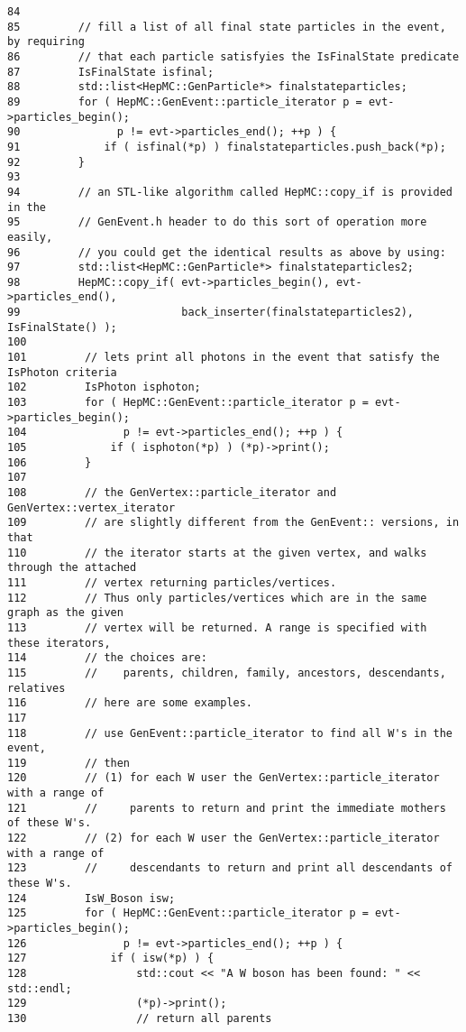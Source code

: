 \begin{DocInclude}
\begin{verbatim}
84 
85         // fill a list of all final state particles in the event, by requiring
86         // that each particle satisfyies the IsFinalState predicate
87         IsFinalState isfinal;
88         std::list<HepMC::GenParticle*> finalstateparticles;
89         for ( HepMC::GenEvent::particle_iterator p = evt->particles_begin();
90               p != evt->particles_end(); ++p ) {
91             if ( isfinal(*p) ) finalstateparticles.push_back(*p);
92         }
93 
94         // an STL-like algorithm called HepMC::copy_if is provided in the
95         // GenEvent.h header to do this sort of operation more easily,
96         // you could get the identical results as above by using:
97         std::list<HepMC::GenParticle*> finalstateparticles2;
98         HepMC::copy_if( evt->particles_begin(), evt->particles_end(), 
99                         back_inserter(finalstateparticles2), IsFinalState() );
100 
101         // lets print all photons in the event that satisfy the IsPhoton criteria
102         IsPhoton isphoton;
103         for ( HepMC::GenEvent::particle_iterator p = evt->particles_begin();
104               p != evt->particles_end(); ++p ) {
105             if ( isphoton(*p) ) (*p)->print();
106         }
107 
108         // the GenVertex::particle_iterator and GenVertex::vertex_iterator
109         // are slightly different from the GenEvent:: versions, in that
110         // the iterator starts at the given vertex, and walks through the attached 
111         // vertex returning particles/vertices.
112         // Thus only particles/vertices which are in the same graph as the given
113         // vertex will be returned. A range is specified with these iterators,
114         // the choices are:
115         //    parents, children, family, ancestors, descendants, relatives 
116         // here are some examples.
117 
118         // use GenEvent::particle_iterator to find all W's in the event,
119         // then 
120         // (1) for each W user the GenVertex::particle_iterator with a range of
121         //     parents to return and print the immediate mothers of these W's.
122         // (2) for each W user the GenVertex::particle_iterator with a range of
123         //     descendants to return and print all descendants of these W's.
124         IsW_Boson isw;
125         for ( HepMC::GenEvent::particle_iterator p = evt->particles_begin();
126               p != evt->particles_end(); ++p ) {
127             if ( isw(*p) ) {
128                 std::cout << "A W boson has been found: " << std::endl;
129                 (*p)->print();
130                 // return all parents

\end{verbatim}
\end{DocInclude}
